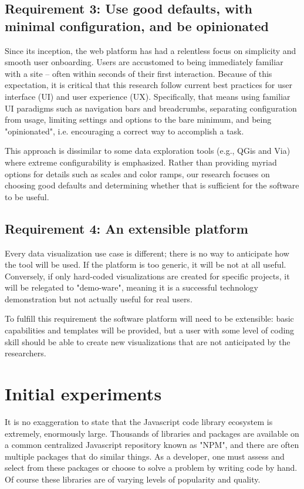 \documentclass[Afour,sagev,times]{sagej}
\begin{document}
\subsection{Requirement 3: Use good defaults, with minimal configuration, and be opinionated}

Since its inception, the web platform has had a relentless focus on simplicity and smooth user onboarding. Users are accustomed to being immediately familiar with a site -- often within seconds of their first interaction. Because of this expectation, it is critical that this research follow current best practices
for user interface (UI) and user experience (UX). Specifically, that means using familiar UI paradigms such as navigation bars and breadcrumbs, separating configuration from usage, limiting settings and options to the bare minimum, and being "opinionated", i.e. encouraging a correct way to accomplish a task.

This approach is dissimilar to some data exploration tools (e.g., QGis and Via) where extreme configurability is emphasized. Rather than providing myriad options for details such as scales and color ramps, our research focuses on choosing good defaults and determining whether that is sufficient for the software to be
useful.

\subsection{Requirement 4: An extensible platform}

Every data visualization use case is different; there is no way to anticipate how the tool will be used. If the platform is too generic, it will be not at all useful. Conversely, if only hard-coded visualizations are created for specific projects, it will be relegated to "demo-ware", meaning it is a successful technology demonstration but not actually useful for real users.

To fulfill this requirement the software platform will need to be extensible: basic capabilities and templates will be provided, but a user with some level of coding skill should be able to create new visualizations that are not anticipated by the researchers.

\section{Initial experiments}

It is no exaggeration to state that the Javascript code library ecosystem is extremely, enormously large. Thousands of libraries and packages are available on a common centralized Javascript repository known as "NPM", and there are often multiple packages that do similar things. As a developer, one must assess and select from these packages or choose to solve a problem by writing code by hand. Of course these libraries are of varying levels of popularity and quality.
\end{document}
